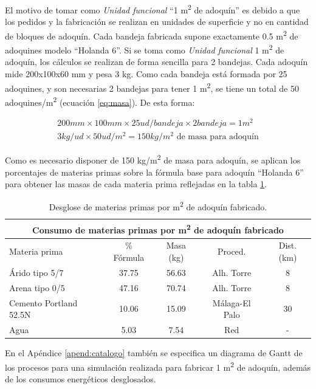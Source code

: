 El motivo de tomar como \textit{Unidad funcional} ``1 \si{m^2} de adoquín'' es debido a que los pedidos y la fabricación se realizan en unidades de superficie y no en cantidad de bloques de adoquín. Cada bandeja fabricada supone exactamente 0.5 \si{m^2} de adoquines modelo ``Holanda 6''. Si se toma como \textit{Unidad funcional} 1 \si{m^2} de adoquín, los cálculos se realizan de forma sencilla para 2 bandejas. Cada adoquín mide 200x100x60 \si{mm} y pesa 3 \si{kg}. Como cada bandeja está formada por 25 adoquines, y son necesarias 2 bandejas para tener 1 \si{m^2}, se tiene un total de 50 adoquines/\si{m^2} (ecuación \ref{eq:masa}). De esta forma:

\begin{gather}
200 mm \times 100 mm \times 25 ud/bandeja \times 2 bandeja = 1 m^2\\
3 kg/ud \times 50 ud/m^2 = 150 kg/m^2 \text{ de masa para adoquín}\label{eq:masa}
\end{gather}

Como es necesario disponer de 150 \si{kg/m^2} de masa para adoquín, se aplican los porcentajes de materias primas sobre la fórmula base para adoquín ``Holanda 6'' para obtener las masas de cada materia prima reflejadas en la tabla \ref{desglosemateriasprimas}.

\begin{table}[!htb]
\centering
\begin{tabular}{lcccc}
\toprule
\multicolumn{5}{c}{Consumo de materias primas por \si{m^2} de adoquín fabricado}\\
\midrule
Materia prima & \% Fórmula & Masa (\si{kg}) & Proced. & Dist. (\si{km})\\
\midrule
Árido tipo 5/7 & 37.75 & 56.63 & Alh. Torre & 8\\
Arena tipo 0/5 & 47.16 & 70.74 & Alh. Torre & 8\\
Cemento Portland 52.5N & 10.06 & 15.09 & Málaga-El Palo & 30\\
Agua & 5.03 & 7.54 & Red & -\\
\bottomrule
\end{tabular}
\caption{Desglose de materias primas por \si{m^2} de adoquín fabricado.}
\label{desglosemateriasprimas}
\end{table}

En el Apéndice \ref{apend:catalogo} también se especifica un diagrama de Gantt de los procesos para una simulación realizada para fabricar 1 \si{m^2} de adoquín, además de los consumos energéticos desglosados.

